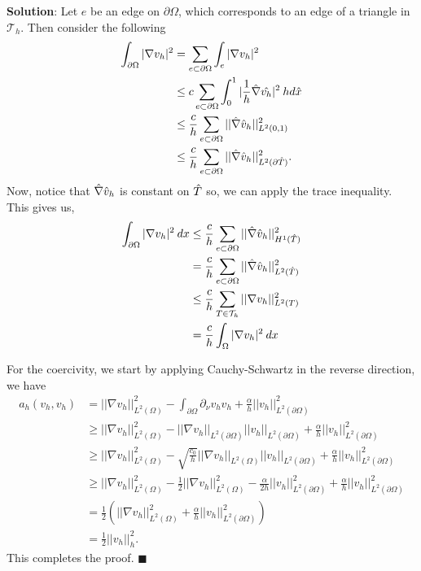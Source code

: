 \documentclass[11pt]{article}
\begin{document}
\textbf{Solution}: Let $e$ be an edge on $\partial\Omega$, which corresponds to an edge of a triangle in $\mathcal{T}_h$.
Then consider the following
\begin{align*}
\int_{\partial\Omega} |\nabla v_h|^2 &= \sum_{e\subset\partial\Omega} \int_e |\nabla v_h|^2 \\
&\leq c\sum_{e\subset \partial\Omega} \int_0^1 |\frac{1}{h}\hat{\nabla}\hat{v_h}|^2 \: h d\hat{x} \\
&\leq \frac{c}{h} \sum_{e\subset\partial\Omega} ||\hat{\nabla}\hat{v}_h||^2_{L^2(0,1)} \\
&\leq \frac{c}{h} \sum_{e\subset \partial \Omega} ||\Hat{\nabla} \Hat{v}_h||^2_{L^2(\partial \Hat{T})}.
\end{align*}
Now, notice that $\Hat{\nabla} \Hat{v}_h$ is constant on $\Hat{T}$ so, we can apply the trace inequality.
This gives us,
\begin{align*}
    \int_{\partial \Omega} |\nabla v_h|^2 \: dx &\leq \frac{c}{h} \sum_{e \subset \partial \Omega} || \Hat{\nabla} \Hat{v}_h ||^2_{H^1(\Hat{T})} \\
    &= \frac{c}{h} \sum_{e \subset \partial \Omega} ||\Hat{\nabla} \Hat{v}_h||^2_{L^2(\Hat{T})} \\
    &\leq \frac{c}{h} \sum_{T \in \mathcal{T}_h} ||\nabla v_h||^2_{L^2(T)} \\
    &= \frac{c}{h} \int_{\Omega} |\nabla v_h|^2 \: dx
\end{align*}

For the coercivity, we start by applying Cauchy-Schwartz in the reverse direction, we have 
\begin{align*}
a_h(v_h, v_h) &= ||\nabla v_h||^2_{L^2(\Omega)} - \int_{\partial\Omega} \partial_\nu v_h v_h + \frac{\alpha}{h}|| v_h||^2_{L^2(\partial\Omega)} \\
&\geq ||\nabla v_h||^2_{L^2(\Omega)} - ||\nabla v_h||_{L^2(\partial\Omega)}||v_h||_{L^2(\partial\Omega)} + \frac{\alpha}{h}||v_h||^2_{L^2(\partial\Omega)} \\
&\geq ||\nabla v_h||^2_{L^2(\Omega)} - \sqrt{\frac{c_0}{h}} ||\nabla v_h||_{L^2(\Omega)} ||v_h||_{L^2(\partial \Omega)} + \frac{\alpha}{h} ||v_h||^2_{L^2(\partial \Omega)} \\
&\geq ||\nabla v_h||^2_{L^2(\Omega)} - \frac{1}{2} ||\nabla v_h||^2_{L^2(\Omega)} - \frac{\alpha}{2h} ||v_h||^2_{L^2(\partial \Omega)} + \frac{\alpha}{h} ||v_h||^2_{L^2(\partial \Omega)} \\
&= \frac{1}{2} (||\nabla v_h||^2_{L^2(\Omega)} + \frac{\alpha}{h}||v_h||^2_{L^2(\partial \Omega)} ) \\
&= \frac{1}{2} ||v_h||^2_h.
\end{align*}
This completes the proof.
$\blacksquare$
\end{document}
